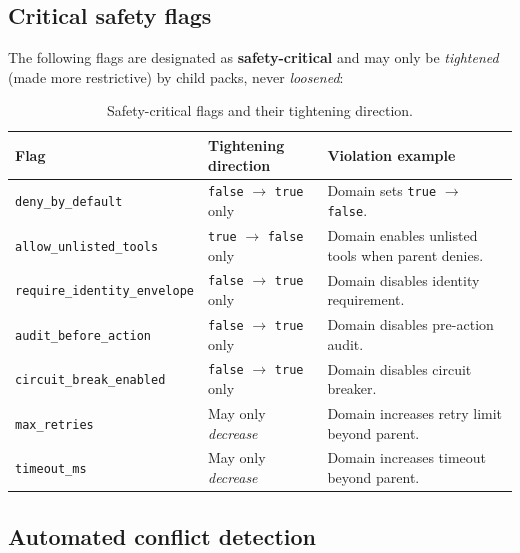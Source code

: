 \subsection{Critical safety flags}

The following flags are designated as \textbf{safety-critical} and
may only be \emph{tightened} (made more restrictive) by child packs,
never \emph{loosened}:

\begin{table}[htbp]
\centering
\footnotesize
\caption{Safety-critical flags and their tightening direction.}
\label{tab:safety-flags}
\begin{tabularx}{\textwidth}{@{}l l X@{}}
\toprule
\textbf{Flag} & \textbf{Tightening direction} & \textbf{Violation example} \\
\midrule
\texttt{deny\_by\_default} & \texttt{false} $\rightarrow$ \texttt{true} only & Domain sets \texttt{true} $\rightarrow$ \texttt{false}. \\
\texttt{allow\_unlisted\_tools} & \texttt{true} $\rightarrow$ \texttt{false} only & Domain enables unlisted tools when parent denies. \\
\texttt{require\_identity\_envelope} & \texttt{false} $\rightarrow$ \texttt{true} only & Domain disables identity requirement. \\
\texttt{audit\_before\_action} & \texttt{false} $\rightarrow$ \texttt{true} only & Domain disables pre-action audit. \\
\texttt{circuit\_break\_enabled} & \texttt{false} $\rightarrow$ \texttt{true} only & Domain disables circuit breaker. \\
\texttt{max\_retries} & May only \emph{decrease} & Domain increases retry limit beyond parent. \\
\texttt{timeout\_ms} & May only \emph{decrease} & Domain increases timeout beyond parent. \\
\bottomrule
\end{tabularx}
\end{table}

\subsection{Automated conflict detection}

